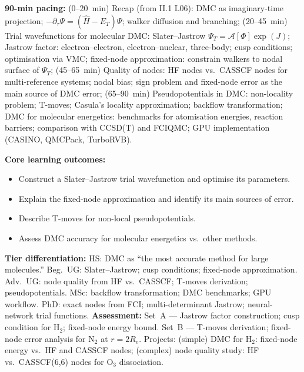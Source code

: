 \documentclass[11pt,a4paper]{article}
\begin{document}
\medskip

\begin{tcolorbox}[chembox, title={Module~III.3 --- Lecture L11: Diffusion Quantum Monte Carlo for Molecules}]
\textbf{90-min pacing:} (0--20~min) Recap (from II.1 L06): DMC as imaginary-time projection; $-\partial_\tau\Psi=(\hat{H}-E_T)\Psi$; walker diffusion and branching; (20--45~min) Trial wavefunctions for molecular DMC: Slater--Jastrow $\Psi_T=\mathcal{A}[\Phi]\exp(J)$; Jastrow factor: electron--electron, electron--nuclear, three-body; cusp conditions; optimisation via VMC; fixed-node approximation: constrain walkers to nodal surface of $\Psi_T$; (45--65~min) Quality of nodes: HF nodes vs.\ CASSCF nodes for multi-reference systems; nodal bias; sign problem and fixed-node error as the main source of DMC error; (65--90~min) Pseudopotentials in DMC: non-locality problem; T-moves; Casula's locality approximation; backflow transformation; DMC for molecular energetics: benchmarks for atomisation energies, reaction barriers; comparison with CCSD(T) and FCIQMC; GPU implementation (CASINO, QMCPack, TurboRVB).

\medskip\textbf{Core learning outcomes:}
\begin{itemize}[leftmargin=1.4em,topsep=2pt,itemsep=1pt]
  \item Construct a Slater--Jastrow trial wavefunction and optimise its parameters.
  \item Explain the fixed-node approximation and identify its main sources of error.
  \item Describe T-moves for non-local pseudopotentials.
  \item Assess DMC accuracy for molecular energetics vs.\ other methods.
\end{itemize}
\medskip\textbf{Tier differentiation:}
HS: DMC as ``the most accurate method for large molecules.''
Beg.\ UG: Slater--Jastrow; cusp conditions; fixed-node approximation.
Adv.\ UG: node quality from HF vs.\ CASSCF; T-moves derivation; pseudopotentials.
MSc: backflow transformation; DMC benchmarks; GPU workflow.
PhD: exact nodes from FCI; multi-determinant Jastrow; neural-network trial functions.
\medskip\textbf{Assessment:}
Set~A --- Jastrow factor construction; cusp condition for H$_2$; fixed-node energy bound.
Set~B --- T-moves derivation; fixed-node error analysis for N$_2$ at $r=2R_e$.
Projects: (simple) DMC for H$_2$: fixed-node energy vs.\ HF and CASSCF nodes; (complex) node quality study: HF vs.\ CASSCF(6,6) nodes for O$_3$ dissociation.
\end{tcolorbox}
\end{document}
